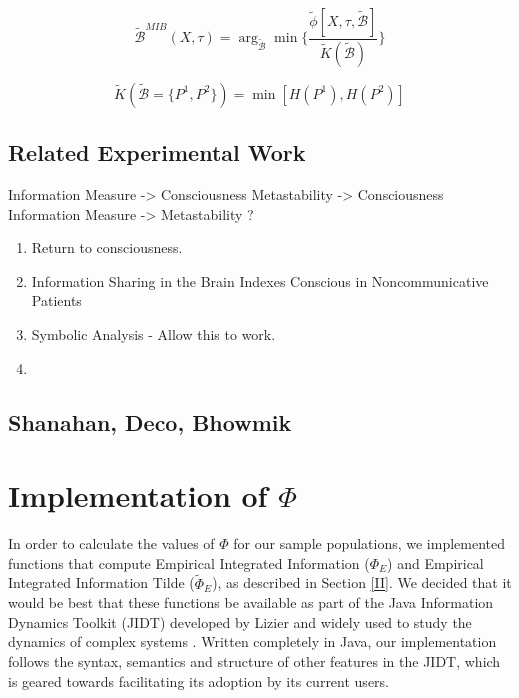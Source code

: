 \documentclass[a4paper,11pt]{article}
\begin{document}
\begin{equation} \label{eq:mib-tilde}
\widetilde{\mathcal{B}}^{MIB}(X, \tau) = \arg_{\widetilde{\mathcal{B}}} \min \Big\lbrace \frac{\tilde{\phi} [X, \tau, \widetilde{\mathcal{B}}]}{\widetilde{K}(\widetilde{\mathcal{B}})} \Big\rbrace
\end{equation}

\begin{equation} \label{eq:norm-tilde}
\widetilde{K}(\widetilde{\mathcal{B}} = \lbrace P^1, P^2 \rbrace) = \min[H(P^1), H(P^2)]
\end{equation}


\subsection{Related Experimental Work}
Information Measure -> Consciousness
Metastability -> Consciousness
Information Measure -> Metastability ?

\begin{enumerate}
\item{Return to consciousness.}
\item{Information Sharing in the Brain Indexes Conscious in Noncommunicative Patients}
\item{Symbolic Analysis - Allow this to work.}
\item{}
\end{enumerate}

\subsection{Shanahan, Deco, Bhowmik}

\clearpage
\section{Implementation of $\Phi$}

In order to calculate the values of $\Phi$ for our sample populations, we implemented functions that compute Empirical Integrated Information ($\Phi_{E}$) and Empirical Integrated Information Tilde ($\widetilde{\Phi}_{E}$), as described in Section \ref{II}. We decided that it would be best that these functions be available as part of the Java Information Dynamics Toolkit (JIDT) developed by Lizier and widely used to study the dynamics of complex systems \cite{Lizier2014}. Written completely in Java, our implementation follows the syntax, semantics and structure of other features in the JIDT, which is geared towards facilitating its adoption by its current users.
\end{document}
